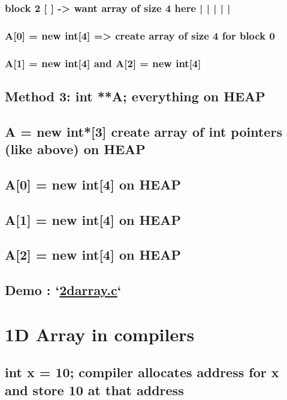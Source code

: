 \documentclass{article}
\begin{document}
\subsubsection{block 2 [ ] -> want array of size 4 here | | | | |}
\label{sec:org5ece4ff}
\subsubsection{A[0] = new int[4] => create array of size 4 for block 0}
\label{sec:org61b2d4c}
\subsubsection{A[1] = new int[4] and A[2] = new int[4]}
\label{sec:org1575f66}
\subsection{Method 3: int **A; everything on HEAP}
\label{sec:orgc839100}
\subsection{A = new int*[3] create array of int pointers (like above) on HEAP}
\label{sec:org014a23d}
\subsection{A[0] = new int[4] on HEAP}
\label{sec:org2bac38c}
\subsection{A[1] = new int[4] on HEAP}
\label{sec:orgf718875}
\subsection{A[2] = new int[4] on HEAP}
\label{sec:orgc05978a}
\subsection{Demo : `\url{2darray.c}`}
\label{sec:org841103b}
\section{1D Array in compilers}
\label{sec:org8441a62}
\subsection{int x = 10; compiler allocates address for x and store 10 at that address}
\label{sec:org9fc6a14}
\end{document}

